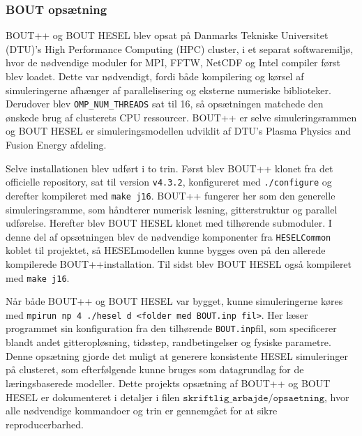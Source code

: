 \subsubsection{BOUT opsætning}
BOUT++ \cite{Dudson_2009} og BOUT HESEL blev opsat på 
Danmarks Tekniske Universitet (DTU)'s High Performance Computing (HPC) cluster, i et separat softwaremiljø, hvor de nødvendige moduler for MPI, FFTW, NetCDF og Intel compiler først blev loadet. Dette var nødvendigt, fordi både kompilering og kørsel af simuleringerne afhænger af parallelisering og eksterne numeriske biblioteker. Derudover blev \texttt{OMP\_NUM\_THREADS} sat til 16, så opsætningen matchede den ønskede brug af clusterets CPU ressourcer.
BOUT++ er selve simuleringsrammen og BOUT HESEL er simuleringsmodellen udviklit af DTU's Plasma Physics and Fusion Energy afdeling.


Selve installationen blev udført i to trin. Først blev BOUT++ klonet fra det officielle repository, sat til version \texttt{v4.3.2}, konfigureret med \texttt{./configure} og derefter kompileret med \texttt{make j16}. BOUT++ fungerer her som den generelle simuleringsramme, som håndterer numerisk løsning, gitterstruktur og parallel udførelse. Herefter blev BOUT HESEL klonet med tilhørende submoduler. I denne del af opsætningen blev de nødvendige komponenter fra \texttt{HESELCommon} koblet til projektet, så HESELmodellen kunne bygges oven på den allerede kompilerede BOUT++installation. Til sidst blev BOUT HESEL også kompileret med \texttt{make j16}.

Når både BOUT++ og BOUT HESEL var bygget, kunne simuleringerne køres med \texttt{mpirun np 4 ./hesel d <folder med BOUT.inp fil>}. Her læser programmet sin konfiguration fra den tilhørende \texttt{BOUT.inp}fil, som specificerer blandt andet gitteropløsning, tidsstep, randbetingelser og fysiske parametre. Denne opsætning gjorde det muligt at generere konsistente HESEL simuleringer på clusteret, som efterfølgende kunne bruges som datagrundlag for de læringsbaserede modeller.
Dette projekts opsætning af BOUT++ og BOUT HESEL er dokumenteret i detaljer i filen $\texttt{skriftlig\_arbajde/opsaetning}$, hvor alle nødvendige kommandoer og trin er gennemgået for at sikre reproducerbarhed.


